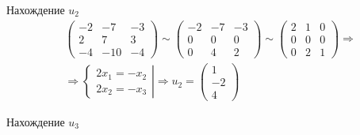 \documentclass[12pt]{article}
\begin{document}
\begin{sloppypar}
    Нахождение $u_2$
    \begin{align*}
         & \begin{pmatrix}
               -2 & -7  & -3 \\
               2  & 7   & 3  \\
               -4 & -10 & -4
           \end{pmatrix}
        \sim
        \begin{pmatrix}
            -2 & -7 & -3 \\
            0  & 0  & 0  \\
            0  & 4  & 2
        \end{pmatrix}
        \sim
        \begin{pmatrix}
            2 & 1 & 0 \\
            0 & 0 & 0 \\
            0 & 2 & 1
        \end{pmatrix}
        \Rightarrow       \\
         & \Rightarrow
        \left.\begin{cases}
                  2x_1 = -x_2 \\
                  2x_2 = -x_3
              \end{cases}\right|
        \Rightarrow
        u_2 = \begin{pmatrix}
                  1 \\ -2 \\ 4
              \end{pmatrix}
    \end{align*}

    Нахождение $u_3$


\end{sloppypar}
\end{document}
